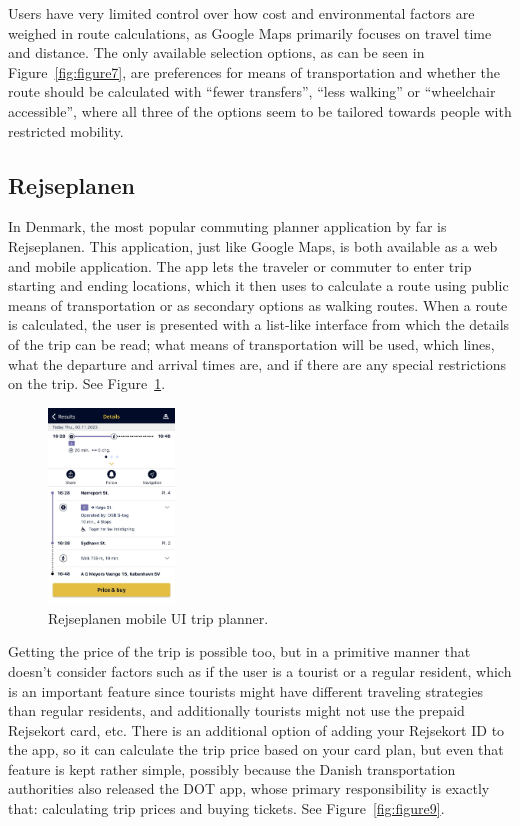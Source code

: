 Users have very limited control over how cost and environmental factors are weighed in route calculations, as Google
Maps primarily focuses on travel time and distance.
The only available selection options, as can be seen in Figure~\ref{fig:figure7}, are preferences for means of
transportation and whether the route should be calculated with ``fewer transfers'', ``less walking'' or ``wheelchair
accessible'', where all three of the options seem to be tailored towards people with restricted mobility.

\subsection{Rejseplanen}\label{subsec:rejseplanen}

In Denmark, the most popular commuting planner application by far is Rejseplanen.
This application, just like Google Maps, is both available as a web and mobile application.
The app lets the traveler or commuter to enter trip starting and ending locations, which it then uses to calculate a
route using public means of transportation or as secondary options as walking routes.
When a route is calculated, the user is presented with a list-like interface from which the details of the trip can be
read; what means of transportation will be used, which lines, what the departure and arrival times are, and if there are
any special restrictions on the trip.
See Figure~\ref{fig:figure8}.

\begin{figure}
    \begin{center}
        \includegraphics[width=0.3\textwidth]{images/rejseplanen-trip}
    \end{center}
    \caption{Rejseplanen mobile UI trip planner.}
    \label{fig:figure8}
\end{figure}

Getting the price of the trip is possible too, but in a primitive manner that doesn't consider factors such as if the
user is a tourist or a regular resident, which is an important feature since tourists might have different traveling
strategies than regular residents, and additionally tourists might not use the prepaid Rejsekort card, etc.
There is an additional option of adding your Rejsekort ID to the app, so it can calculate the trip price based on your
card plan, but even that feature is kept rather simple, possibly because the Danish transportation authorities also
released the DOT app, whose primary responsibility is exactly that: calculating trip prices and buying tickets.
See Figure~\ref{fig:figure9}.

